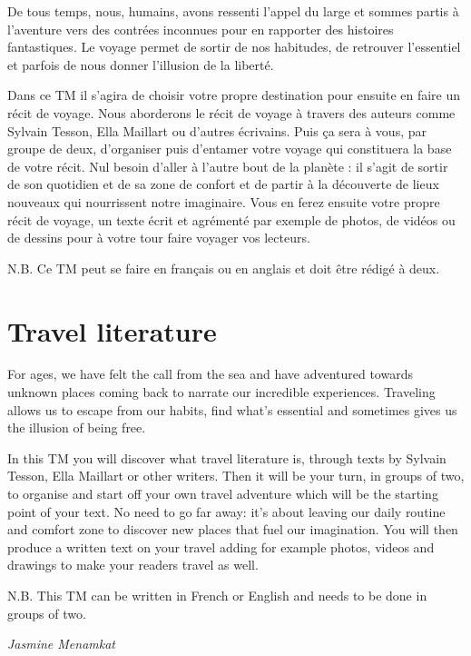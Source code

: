 \documentclass[
  10pt,
  french,
  a5paper,
  openany]{book}
\newenvironment{signature}{\begin{flushright}}{\end{flushright}}
\begin{document}
De tous temps, nous, humains, avons ressenti l'appel du large et sommes partis à l'aventure vers des contrées inconnues pour en rapporter des histoires fantastiques. Le voyage permet de sortir de nos habitudes, de retrouver l'essentiel et parfois de nous donner l'illusion de la liberté.

Dans ce TM il s'agira de choisir votre propre destination pour ensuite en faire un récit de voyage. Nous aborderons le récit de voyage à travers des auteurs comme Sylvain Tesson, Ella Maillart ou d'autres écrivains. Puis ça sera à vous, par groupe de deux, d'organiser puis d'entamer votre voyage qui constituera la base de votre récit. Nul besoin d'aller à l'autre bout de la planète : il s'agit de sortir de son quotidien et de sa zone de confort et de partir à la découverte de lieux nouveaux qui nourrissent notre imaginaire. Vous en ferez ensuite votre propre récit de voyage, un texte écrit et agrémenté par exemple de photos, de vidéos ou de dessins pour à votre tour faire voyager vos lecteurs.

N.B. Ce TM peut se faire en français ou en anglais et doit être rédigé à deux.

\hypertarget{travel-literature}{%
\section*{Travel literature}\label{travel-literature}}

For ages, we have felt the call from the sea and have adventured towards unknown places coming back to narrate our incredible experiences. Traveling allows us to escape from our habits, find what's essential and sometimes gives us the illusion of being free.

In this TM you will discover what travel literature is, through texts by Sylvain Tesson, Ella Maillart or other writers. Then it will be your turn, in groups of two, to organise and start off your own travel adventure which will be the starting point of your text. No need to go far away: it's about leaving our daily routine and comfort zone to discover new places that fuel our imagination. You will then produce a written text on your travel adding for example photos, videos and drawings to make your readers travel as well.

N.B. This TM can be written in French or English and needs to be done in groups of two.

\begin{signature}
\emph{Jasmine Menamkat}

\end{signature}
\end{document}
